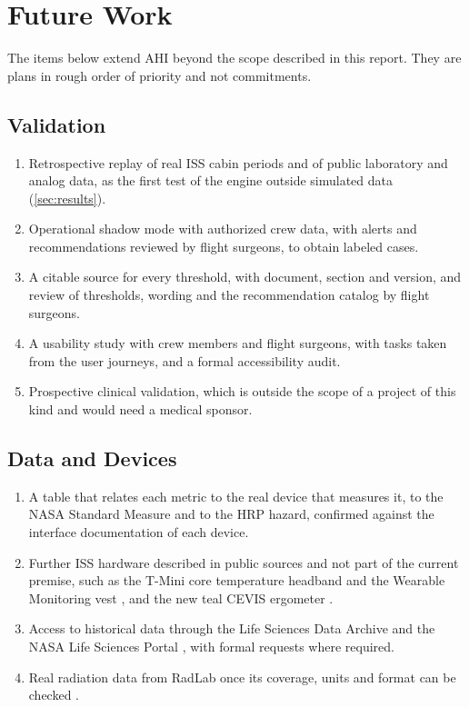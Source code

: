 \section{Future Work}
\label{sec:future-work}

The items below extend AHI beyond the scope described in this report. They are plans in rough order of priority and not commitments.

\subsection{Validation}
\label{subsec:future-validation}

\begin{enumerate}
\item Retrospective replay of real ISS cabin periods and of public laboratory and analog data, as the first test of the engine outside simulated data (\ref{sec:results}).
\item Operational shadow mode with authorized crew data, with alerts and recommendations reviewed by flight surgeons, to obtain labeled cases.
\item A citable source for every threshold, with document, section and version, and review of thresholds, wording and the recommendation catalog by flight surgeons.
\item A usability study with crew members and flight surgeons, with tasks taken from the user journeys, and a formal accessibility audit.
\item Prospective clinical validation, which is outside the scope of a project of this kind and would need a medical sponsor.
\end{enumerate}

\subsection{Data and Devices}
\label{subsec:future-real-data}

\begin{enumerate}
\item A table that relates each metric to the real device that measures it, to the NASA Standard Measure and to the HRP hazard, confirmed against the interface documentation of each device.
\item Further ISS hardware described in public sources and not part of the current premise, such as the T-Mini core temperature headband and the Wearable Monitoring vest \cite{nasa_wearable_tech_iss}, and the new teal CEVIS ergometer \cite{nasa_jsc_exercise_countermeasures}.
\item Access to historical data through the Life Sciences Data Archive and the NASA Life Sciences Portal \cite{nasa_lsda,nasa_nlsp}, with formal requests where required.
\item Real radiation data from RadLab once its coverage, units and format can be checked \cite{osdr_radlab}.
\end{enumerate}

